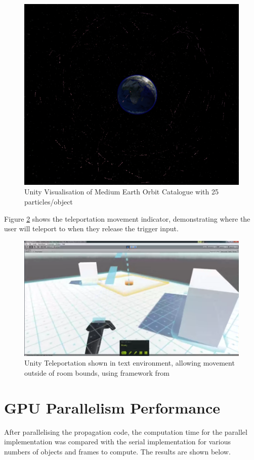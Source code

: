 \documentclass[12pt,openany,a4paper]{book}
\begin{document}
				\begin{figure}[H]
					\centering
					\caption{Unity Visualisation of Medium Earth Orbit Catalogue with 25 particles/object}
					\label{unityMEO}
					\includegraphics[scale=0.55]{uMEO.png}
				\end{figure}
				Figure \ref{unityTele} shows the teleportation movement indicator, demonstrating where the user will teleport to when they release the trigger input. 
				\begin{figure}[H]
					\centering
					\caption{Unity Teleportation shown in text environment, allowing movement outside of room bounds, using framework from \cite{tele}}
					\label{unityTele}
					\includegraphics[scale=0.5]{telescript.png}
				\end{figure}

		\section{GPU Parallelism Performance}
		\label{gpuPerf}
		After parallelising the propagation code, the computation time for the parallel implementation was compared with the serial implementation for various numbers of objects and frames to compute. The results are shown below.
		
\end{document}
